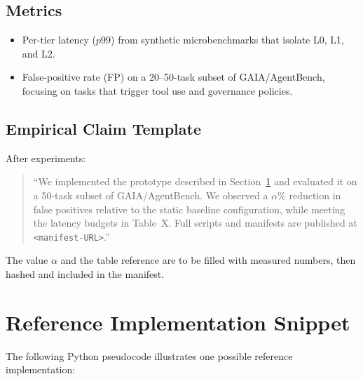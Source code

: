 \documentclass[11pt]{article}
\begin{document}
\subsection{Metrics}

\begin{itemize}
  \item Per-tier latency (\(p99\)) from synthetic microbenchmarks that isolate L0, L1, and L2.
  \item False-positive rate (FP) on a 20–50-task subset of GAIA/AgentBench, focusing on tasks that trigger tool use and governance policies.
\end{itemize}

\subsection{Empirical Claim Template}

After experiments:

\begin{quote}
``We implemented the prototype described in Section~\ref{sec:code} and evaluated it on a 50-task subset of GAIA/AgentBench. We observed a \(\alpha\%\) reduction in false positives relative to the static baseline configuration, while meeting the latency budgets in Table~X. Full scripts and manifests are published at \texttt{<manifest-URL>}.''
\end{quote}

The value \(\alpha\) and the table reference are to be filled with measured numbers, then hashed and included in the manifest.

\section{Reference Implementation Snippet}
\label{sec:code}

The following Python pseudocode illustrates one possible reference implementation:
\end{document}
